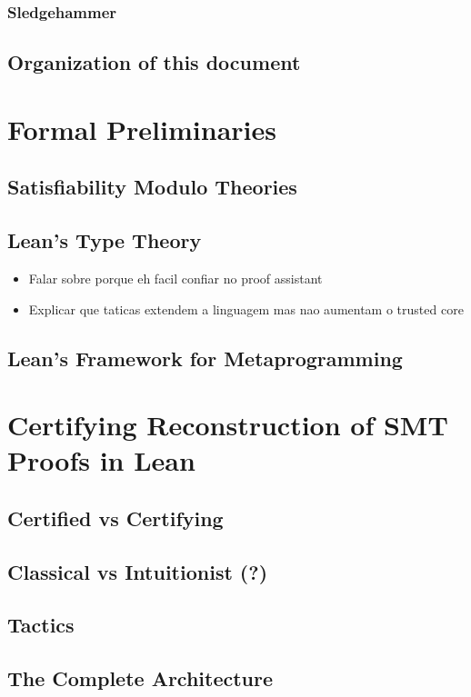 \documentclass[
	msc,
	english
]{ppgccufmg}
\begin{document}
		\subsection{Sledgehammer}
           \label{sec:sledgehammer}
			
	  \section{Organization of this document}
	    
	\chapter{Formal Preliminaries}
	  \section{Satisfiability Modulo Theories}
	  \section{Lean's Type Theory}
	    \begin{itemize}
	      \item Falar sobre porque eh facil confiar no proof assistant
		  \item Explicar que taticas extendem a linguagem mas nao aumentam o trusted core
	    \end{itemize}
	  \section{Lean's Framework for Metaprogramming}
	\chapter{Certifying Reconstruction of SMT Proofs in Lean}
	  \section{Certified vs Certifying}
      \label{sec:certifiedVsCertifying}
	  \section{Classical vs Intuitionist (?)}
	  \section{Tactics}
	  \section{The Complete Architecture}
\end{document}
